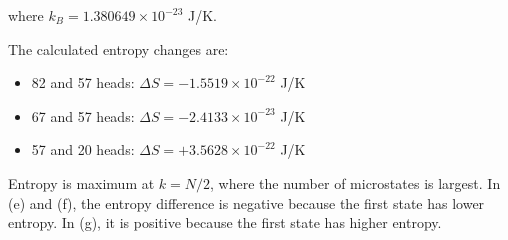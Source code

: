 where $k_B=1.380649\times10^{-23}$ J/K.

The calculated entropy changes are:

\begin{itemize}
    \item[(e)] 82 and 57 heads:
    $\Delta S=-1.5519\times10^{-22}$ J/K

    \item[(f)] 67 and 57 heads:
    $\Delta S=-2.4133\times10^{-23}$ J/K

    \item[(g)] 57 and 20 heads:
    $\Delta S=+3.5628\times10^{-22}$ J/K
\end{itemize}

Entropy is maximum at $k=N/2$, where the number of microstates is largest. In (e) and (f), the entropy difference is negative because the first state has lower entropy. In (g), it is positive because the first state has higher entropy.
